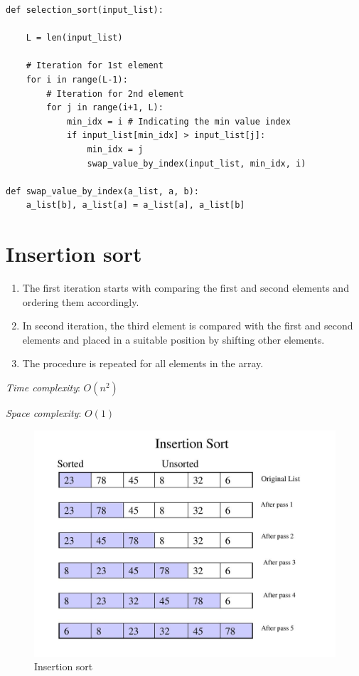 \documentclass[a4paper,11pt]{book}
\begin{document}
\begin{lstlisting}
def selection_sort(input_list):

    L = len(input_list)
    
    # Iteration for 1st element
    for i in range(L-1): 
        # Iteration for 2nd element
        for j in range(i+1, L): 
            min_idx = i # Indicating the min value index
            if input_list[min_idx] > input_list[j]:
                min_idx = j
                swap_value_by_index(input_list, min_idx, i)
                
def swap_value_by_index(a_list, a, b):
    a_list[b], a_list[a] = a_list[a], a_list[b]
\end{lstlisting}

\newpage
\section{Insertion sort}

\begin{enumerate}
	\item The first iteration starts with comparing the first and second elements and ordering them accordingly.
	\item In second iteration, the third element is compared with the first and second elements and placed in a suitable position by shifting other elements.
	\item The procedure is repeated for all elements in the array.
\end{enumerate}

\noindent \textit{Time complexity}: $O(n^2)$

\noindent \textit{Space complexity}: $O(1)$

\begin{figure}[ht]
	\centering
	\includegraphics[scale=1.2]{code/sort/pic/picinsertion.jpg}
	\caption{Insertion sort}
\end{figure}
\end{document}
